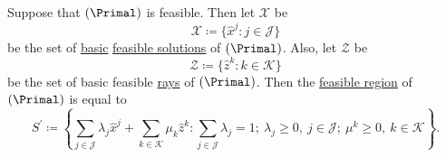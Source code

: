 \begin{theorem}\label{thm:representation}
	Suppose that \((\Primal)\) is feasible. Then let \(\mathcal{X}\) be
	\[
		\mathcal{X} \coloneqq \{\hat{x}^j \colon j\in \mathcal{J}\}
	\]
	be the set of \hyperref[def:basic-solution]{basic} \hyperref[def:feasible-solution]{feasible solutions} of \((\Primal)\). Also, let \(\mathcal{Z}\) be
	\[
		\mathcal{Z}\coloneqq \{\hat{z}^k\colon k\in \mathcal{K}\}
	\]
	be the set of basic feasible \hyperref[def:ray]{rays} of \((\Primal)\). Then the \hyperref[def:feasible-region]{feasible region} of \((\Primal)\) is equal to
	\[
		S^\prime\coloneqq \left\{\sum\limits_{j\in\mathcal{J}} \lambda_{j} \hat{x}^j + \sum\limits_{k\in\mathcal{K}}\mu_k \hat{z}^k\colon \sum\limits_{j\in\mathcal{J}}\lambda_{j} = 1;\ \lambda_{j}\geq 0,\ j\in \mathcal{J};\ \mu^k\geq 0,\ k\in \mathcal{K}\right\}.
	\]
\end{theorem}
